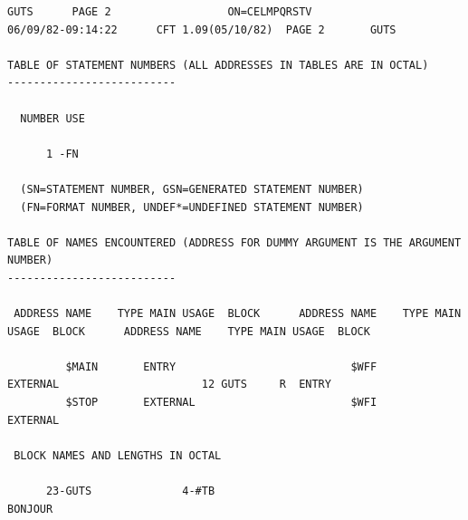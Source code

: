 {\fontsize{5}{6}\selectfont
\begin{verbatim}
GUTS      PAGE 2                  ON=CELMPQRSTV                06/09/82-09:14:22      CFT 1.09(05/10/82)  PAGE 2       GUTS

TABLE OF STATEMENT NUMBERS (ALL ADDRESSES IN TABLES ARE IN OCTAL)
--------------------------

  NUMBER USE

      1 -FN

  (SN=STATEMENT NUMBER, GSN=GENERATED STATEMENT NUMBER)
  (FN=FORMAT NUMBER, UNDEF*=UNDEFINED STATEMENT NUMBER)

TABLE OF NAMES ENCOUNTERED (ADDRESS FOR DUMMY ARGUMENT IS THE ARGUMENT NUMBER)
--------------------------

 ADDRESS NAME    TYPE MAIN USAGE  BLOCK      ADDRESS NAME    TYPE MAIN USAGE  BLOCK      ADDRESS NAME    TYPE MAIN USAGE  BLOCK

         $MAIN       ENTRY                           $WFF        EXTERNAL                      12 GUTS     R  ENTRY
         $STOP       EXTERNAL                        $WFI        EXTERNAL

 BLOCK NAMES AND LENGTHS IN OCTAL

      23-GUTS              4-#TB
BONJOUR
\end{verbatim}
}
